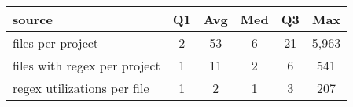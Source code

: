 \begin{center}
\begin{tabular}{l|ccccc}
\toprule
source & Q1 & Avg & Med & Q3 & Max \\
\midrule
files per project & 2 & 53 & 6 & 21 & 5,963 \\
\midrule
files with regex per project & 1 & 11 & 2 & 6 & 541 \\
\midrule
regex utilizations per file & 1 & 2 & 1 & 3 & 207 \\
\bottomrule
\end{tabular}
\end{center}
